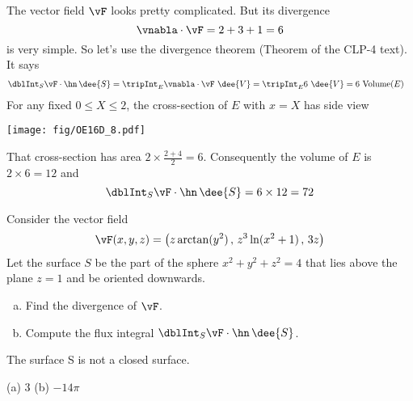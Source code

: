 \begin{solution} 
The vector field $\vF$ looks pretty complicated. But its divergence
\begin{equation*}
\vnabla\cdot\vF = 2 + 3 + 1 = 6
\end{equation*}
is very simple. So let's use the divergence theorem
(Theorem  of the CLP-4 text). It says
\begin{align*}
\dblInt_S \vF\cdot\hn\,\dee{S}
&=\tripInt_E \vnabla\cdot\vF\ \dee{V}
=\tripInt_E 6\ \dee{V}
=6\ \text{Volume}(E)
\end{align*}
For any fixed $0\le X\le 2$, the cross-section of $E$ with $x=X$ has side view
\begin{center}
     \texttt{[image: fig/OE16D\_8.pdf]}
\end{center}
That cross-section has area $2\times \frac{2+4}{2}=6$. Consequently the 
volume of $E$ is $2\times 6=12$ and
\begin{equation*}
\dblInt_S \vF\cdot\hn\,\dee{S}
=6\times 12
=72
\end{equation*}
\end{solution}

\begin{question}[M317 2017A] %
Consider the vector field
\begin{equation*}
 \vF(x, y, z) = \big(z \arctan(y^2)\,,\, z^3 \ln(x^2 + 1)\,,\, 3z\big)
\end{equation*}
Let the surface $S$ be the part of the sphere $x^2 + y^2 + z^2 = 4$ 
that lies above the plane $z = 1$ and be oriented downwards.
\begin{enumerate}[(a)]
\item
Find the divergence of $\vF$.

\item
Compute the flux integral $\dblInt_S \vF \cdot\hn\,\dee{S}$.

\end{enumerate}
\end{question}

\begin{hint} 
The surface S is not a closed surface.
\end{hint}

\begin{answer} 
(a) $3$\qquad
(b) $-14\pi$
\end{answer}

